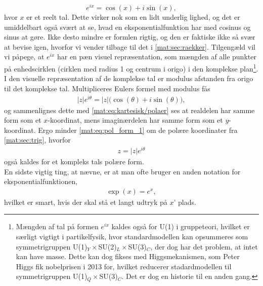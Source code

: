 \begin{equation}
    \label{mat:eq:Eulers_formel}
    e^{ix} = \cos(x) + i \sin(x),
\end{equation}
hvor $x$ er et reelt tal. Dette virker nok som en lidt underlig lighed, og det er umiddelbart også svært at se, hvad en eksponentialfunktion har med cosinus og sinus at gøre. Ikke desto mindre er formlen rigtig, og den er faktiske ikke så svær at bevise igen, hvorfor vi vender tilbage til det i \cref{mat:sec:raekker}. Tilgengæld vil vi påpege, at $e^{ix}$ har en pæn visuel repræsentation, som mængden af alle punkter på enhedscirklen (cirklen med radius 1 og centrum i origo) i den komplekse plan\footnote{Mængden af tal på formen $e^{ix}$ kaldes også for U(1) i gruppeteori, hvilket er særligt vigtigt i partikelfysik, hvor standardmodellen kan opsummeres som symmetrigruppen U(1)$_Y\times$SU(2)$_L\times$SU(3)$_C$, der dog har det problem, at intet kan have masse. Dette kan dog fikses med Higgsmekanismen, som Peter Higgs fik nobelprisen i 2013 for, hvilket reducerer stadardmodellen til symmetrigruppen U(1)$_Q\times$SU(3)$_C$. Det er dog en historie til en anden gang.}. I den visuelle repræsentation af de komplekse tal er modulus afstanden fra origo til det komplekse tal. Multipliceres Eulers formel med modulus fås
%
\begin{align} \label{mat:eq:pol_form_1}
    |z|e^{i\theta} = |z|\Big(\cos(\theta) + i \sin(\theta)\Big),
\end{align}
%
og sammenlignes dette med \cref{mat:eq:kartesisk/polaer} ses at realdelen har samme form som et $x$-koordinat, mens imaginærdelen har samme form som et $y$-koordinat. Ergo minder \cref{mat:eq:pol_form_1} om de polære koordinater fra \cref{mat:sec:trig}, hvorfor
%
\begin{align} \label{mat:eq:pol_form}
    z = |z|e^{i\theta}
\end{align}
%
også kaldes for et kompleks tals polære form. \\
En sidste vigtig ting, at nævne, er at man ofte bruger en anden notation for eksponentialfunktionen,
%
\begin{align}
    \exp(x) = e^x,
\end{align}
%
hvilket er smart, hvis der skal stå et langt udtryk på $x$' plads.